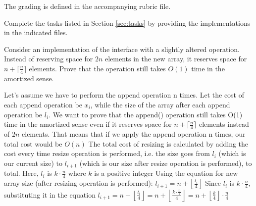 \documentclass[addpoints]{exam}
\begin{document}
The grading is defined in the accompanying rubric file.
\begin{questions}
   Complete the tasks listed in Section \ref{sec:tasks} by providing the implementations in the indicated files.


  Consider an  implementation of the  interface with a slightly altered  operation. Instead of reserving space for $2n$ elements in the new array, it reserves space for $n + \lceil \frac{n}{4} \rceil$ elements. Prove that the  operation still takes $O(1)$ time in the amortized sense.
  \begin{solution}
    \newline
    Let's assume we have to perform the append operation n times. 
    Let the cost of each append operation be $x_i$, while the size of the array after each append operation be $l_i$. 
    \newline
    \newline
    We want to prove that the append() operation still takes O(1) time in the amortized sense even if it reserves space for $n + \lceil \frac{n}{4} \rceil$ elements instead of $2n$ elements.
    That means that if we apply the append operation n times, our total cost would be $O(n)$
    \newline
    \newline
    The total cost of resizing is calculated by adding the cost every time resize operation is performed, i.e. the size goes from $l_i$ (which is our current size) to $l_{i+1}$ (which is our size after resize operation is performed), to total.  Here, $l_i$ is $k \cdot \frac{n}{4}$ where $k$ is a positive integer
    \newline
    \newline
    Using the equation for new array size (after resizing operation is performed):
    \newline
    \newline
    $l_{i+1} = n + \left\lfloor \frac{l_i}{4} \right\rfloor$
    \newline
    \newline
    Since $l_i$ is $k \cdot \frac{n}{4}$, substituting it in the equation $l_{i+1} = n + \left\lfloor \frac{l_i}{4} \right\rfloor = n + \left\lfloor \frac{k \cdot \frac{n}{4}}{4} \right\rfloor = n + \left\lfloor \frac{k}{4} \right\rfloor \cdot \frac{n}{4}$
    \newline
    \newline

\end{solution}
\end{questions}
\end{document}

